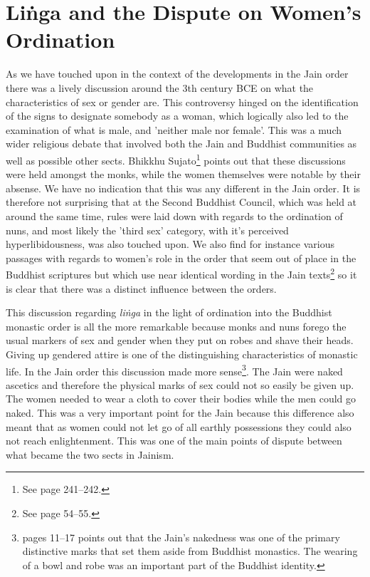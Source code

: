 \section{Liṅga and the Dispute on Women's Ordination}
\label{linga}

As we have touched upon in the context of the developments in the Jain order there was a lively discussion around the 3th century BCE on what the characteristics of sex or gender are. This controversy hinged on the identification of the signs to designate somebody as a woman, which logically also led to the examination of what is male, and 'neither male nor female'. This was a much wider religious debate that involved both the Jain and Buddhist communities as well as possible other sects. Bhikkhu Sujato\footnote{See \cite{sujato2009} page 241–242.} points out that these discussions were held amongst the monks, while the women themselves were notable by their absense. We have no indication that this was any different in the Jain order. It is therefore not surprising that at the Second Buddhist Council, which was held at around the same time, rules were laid down with regards to the ordination of nuns, and most likely the 'third sex' category, with it's perceived hyperlibidousness, was also touched upon. We also find for instance various passages with regards to women's role in the order that seem out of place in the Buddhist scriptures but which use near identical wording in the Jain texts\footnote{See \cite{sujato2009} page 54–55.} so it is clear that there was a distinct influence between the orders.

This discussion regarding {\em liṅga} in the light of ordination into the Buddhist monastic order is all the more remarkable because monks and nuns forego the usual markers of sex and gender when they put on robes and shave their heads. Giving up gendered attire is one of the distinguishing characteristics of monastic life. In the Jain order this discussion made more sense\footnote{\cite{maes2016} pages 11–17 points out that the Jain's nakedness was one of the primary distinctive marks that set them aside from Buddhist monastics. The wearing of a bowl and robe was an important part of the Buddhist identity.}. The Jain were naked ascetics and therefore the physical marks of sex could not so easily be given up. The women needed to wear a cloth to cover their bodies while the men could go naked. This was a very important point for the Jain because this difference also meant that as women could not let go of all earthly possessions they could also not reach enlightenment. This was one of the main points of dispute between what became the two sects in Jainism.

